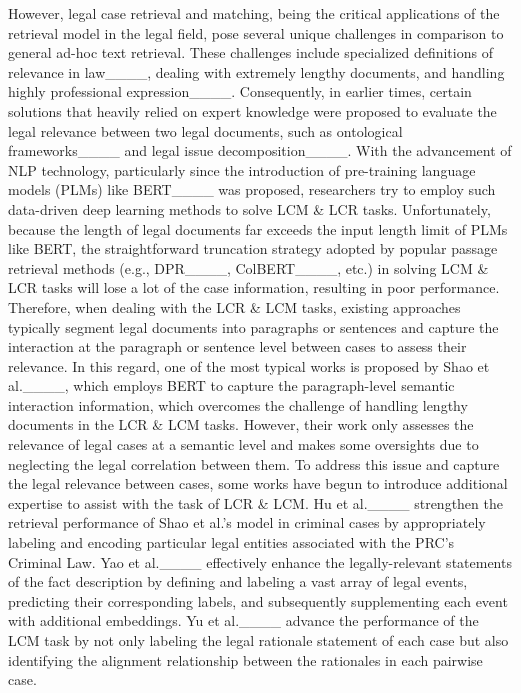 However, legal case retrieval and matching, being the critical applications of the retrieval model in the legal field, pose several unique challenges in comparison to general ad-hoc text retrieval. These challenges include specialized definitions of relevance in law____, dealing with extremely lengthy documents, and handling highly professional expression____.
Consequently, in earlier times, certain solutions that heavily relied on expert knowledge were proposed to evaluate the legal relevance between two legal documents, such as ontological frameworks____ and legal issue decomposition____.
With the advancement of NLP technology, particularly since the introduction of pre-training language models (PLMs) like BERT____ was proposed, researchers try to employ such data-driven deep learning methods to solve LCM \& LCR tasks.
Unfortunately, because the length of legal documents far exceeds the input length limit of PLMs like BERT, the straightforward truncation strategy adopted by popular passage retrieval methods (e.g., DPR____, ColBERT____, etc.) in solving LCM \& LCR tasks will lose a lot of the case information, resulting in poor performance.
Therefore, when dealing with the LCR \& LCM tasks, existing approaches typically segment legal documents into paragraphs or sentences and capture the interaction at the paragraph or sentence level between cases to assess their relevance. 
In this regard, one of the most typical works is proposed by Shao et al.____, which employs BERT to capture the paragraph-level semantic interaction information, which overcomes the challenge of handling lengthy documents in the LCR \& LCM tasks.
However, their work only assesses the relevance of legal cases at a semantic level and makes some oversights due to neglecting the legal correlation between them.
To address this issue and capture the legal relevance between cases, some works have begun to introduce additional expertise to assist with the task of LCR \& LCM.
Hu et al.____ strengthen the retrieval performance of Shao et al.'s model in criminal cases by appropriately labeling and encoding particular legal entities associated with the PRC’s Criminal Law.
Yao et al.____ effectively enhance the legally-relevant statements of the fact description by defining and labeling a vast array of legal events, predicting their corresponding labels, and subsequently supplementing each event with additional embeddings.
Yu et al.____ advance the performance of the LCM task by not only labeling the legal rationale statement of each case but also identifying the alignment relationship between the rationales in each pairwise case.
